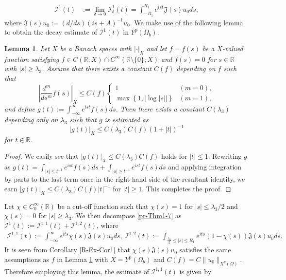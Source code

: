 \documentclass[dvipdfmx,12pt]{article}
\newtheorem{lem}[dfn]{Lemma}
\begin{document}
\begin{align}\label{pr-Thm1-7}
\mathcal{I}^{1}(t)&:=\lim_{\delta\to0}\mathcal{I}_\delta^{1 }(t)=\int_{-R_1}^{R_1}e^{is t} \mathfrak{J}(s)u_0 ds,
\end{align}
where $\mathfrak{J}(s)u_0:=(d/ds)(is+A)^{-1}u_0$. We make use of the following lemma to obtain the decay estimate of $\mathcal{I}^{1 }(t)$ in $Y^p(\Omega_b)$. 
\begin{lem}\label{pr-Thm1-lem}
Let $X$ be a Banach spaces with $|\cdot|_X$ and let $f=f(s)$ be a $X$-valued  function satisfying $f\in C(\mathbb{R}; X)\cap C^\infty(\mathbb{R}\setminus\{0\}; X)$ and $f(s)=0$ for $s\in\mathbb{R}$ with $|s|\ge \lambda_3$. Assume that there exists a constant $C(f)$ depending on $f$ such that
\[
\left|\frac{d^m}{d s^m}f(s)\right|_X \le C(f)
\begin{cases}
1 & (m=0), \\
\max\left\{1,\left|\log|s| \right| \right\} & (m=1),
\end{cases}
\]
and define $g(t):=\int_{-\infty}^\infty e^{is t}f(s)ds$. Then there exists a constant $C(\lambda_3)$ depending only on $\lambda_3$ such that $g$ is estimated as 
\[
|g(t)|_X\le C(\lambda_3) C(f) (1+|t|)^{-1}
\]
for $t\in \mathbb{R}$.
\end{lem}
\begin{proof}
We easily see that $|g(t)|_X\le C(\lambda_3)C(f)$ holds for $|t|\le 1$. Rewriting $g$ as $g(t)=\int_{|s|\le t^{-1}}e^{is t}f(s)ds+\int_{|s|\ge t^{-1}} e^{is t}f(s)ds$ and applying integration by parts to the last term once in the right-hand side of the resultant identity, we earn $|g(t)|_X\le C(\lambda_3)C(f) |t|^{-1}$ for $|t|\ge 1$. 
This completes the proof.
\end{proof}
Let $\chi\in C_0^\infty(\mathbb{R})$ be a cut-off function such that $\chi(s)=1$ for $|s|\le \lambda_3/2$ and $\chi(s)=0$ for $|s|\ge \lambda_3$. We then decompose \eqref{pr-Thm1-7} as $\mathcal{I}^{1 }(t):=\mathcal{I}^{1,1 }(t)+\mathcal{I}^{1,2 }(t)$, where
\begin{gather*}
\mathcal{I}^{1,1 }(t):=\int_{-\infty}^{\infty}e^{its} \chi(s)  \mathfrak{J}(s)u_0 ds,~
\mathcal{I}^{1,2 }(t):=\int_{\frac{\lambda_2}{2}\le|s|\le R_1}e^{its} (1-\chi(s)) \mathfrak{J}(s)u_0 ds.
\end{gather*}
It is seen from Corollary \ref{R-Ex-Cor1} that $\chi(s)  \mathfrak{J}(s)u_0$ satisfies the same assumptions as $f$ in Lemma \ref{pr-Thm1-lem} with $X=Y^p(\Omega_b)$ and $C(f)=C\|u_0\|_{X^p(\Omega)}$. Therefore employing this lemma, the estimate of $\mathcal{I}^{1,1 }(t)$ is given by
\end{document}
